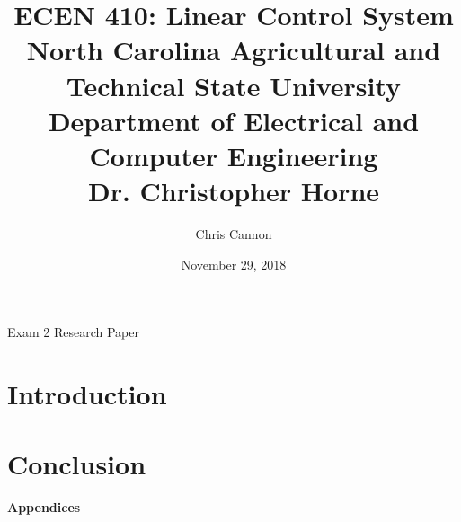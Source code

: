 \documentclass[11pt]{article}
\title {{\titleFont ECEN 410:  Linear Control System \\ North Carolina Agricultural and Technical State University \\ Department of Electrical and Computer Engineering \\ Dr. Christopher Horne}} %
\author{\titleFont  Chris Cannon} %
\date{\titleFont November 29, 2018}
\begin{document}
\begin{titlingpage}
\maketitle
\begin{center}
	Exam 2 Research Paper
\end{center}
\end{titlingpage}

\tableofcontents

\pagebreak

\section{Introduction}


\section{Conclusion}

\pagebreak

\textbf{Appendices}

\begin{appendices}


\end{appendices}
\end{document}
